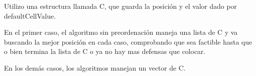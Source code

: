 Utilizo una estructura llamada C, que guarda la posición y el valor dado por defaultCellValue.

En el primer caso, el algoritmo sin preordenación maneja una lista de C y va buscando la mejor posición en cada caso, comprobando que sea factible hasta que o bien termina la lista de C o ya no hay mas defensas que colocar.

En los demás casos, los algoritmos manejan un vector de C.